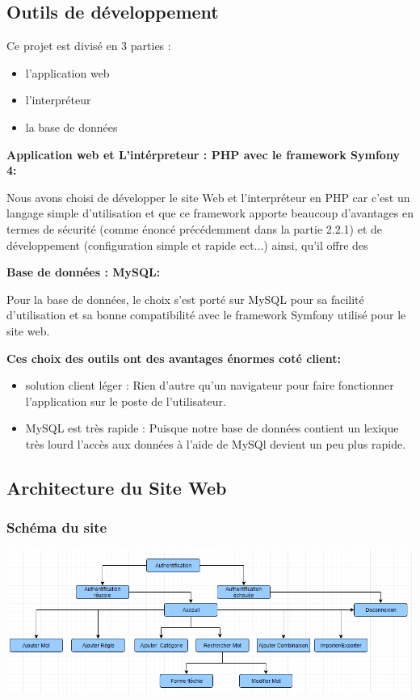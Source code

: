 \documentclass[12pt,a4paper]{article}
\begin{document}
\subsection{Outils de développement}

Ce projet est divisé en 3 parties :
\begin{itemize}  
  \item l'application web
  \item l'interpréteur
  \item la base de données
\end{itemize}

\textbf{Application web et L'intérpreteur : PHP avec le framework Symfony 4:}

Nous avons choisi de développer le site Web et l'interpréteur en PHP car c'est un langage simple d'utilisation et que ce framework apporte beaucoup d'avantages en termes de sécurité (comme énoncé précédemment dans la partie 2.2.1) et de développement (configuration simple et rapide ect...) ainsi, qu'il offre des 

\smallbreak

\textbf{Base de données : MySQL:}


Pour la base de données, le choix s'est porté sur MySQL pour sa facilité d'utilisation et sa bonne compatibilité avec le framework Symfony utilisé pour le site web. 


\textbf{Ces choix des outils ont des avantages énormes coté client:}

\begin{itemize}  
  \item solution client léger : Rien d'autre qu'un navigateur pour faire fonctionner l'application sur le poste de l'utilisateur.
  \item MySQL est très rapide : Puisque notre base de données contient un lexique très lourd l'accès aux données à l'aide de MySQl devient un peu plus rapide.
\end{itemize}

\subsection{ Architecture du Site Web }
\subsubsection{Schéma du site} 

\includegraphics[width=150mm]{img/site.PNG}
\end{document}
